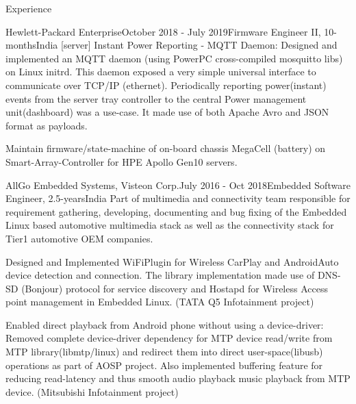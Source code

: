 \documentclass[
	a4paper, %
	11pt, %
]{resume} %
\begin{document}
\begin{rSection}{Experience}
\begin{rSubsection}{Hewlett-Packard Enterprise}{October 2018 - July 2019}{Firmware Engineer II, 10-months}{India}
            [server] Instant Power Reporting - MQTT Daemon: Designed and implemented an MQTT daemon (using PowerPC cross-compiled mosquitto libs) on Linux initrd. This daemon exposed a very simple universal interface to communicate over TCP/IP (ethernet). Periodically reporting power(instant) events from the server tray controller to the central Power management unit(dashboard) was a use-case. It made use of both Apache Avro and JSON format as payloads.
            
            Maintain firmware/state-machine of on-board chassis MegaCell (battery) on Smart-Array-Controller for HPE
Apollo Gen10 servers.


	\end{rSubsection}

	\begin{rSubsection}{AllGo Embedded Systems, Visteon Corp.}{July 2016 - Oct 2018}{Embedded Software Engineer, 2.5-years}{India}
            Part of multimedia and connectivity team responsible for requirement gathering, developing, documenting and bug fixing of the Embedded Linux based automotive multimedia stack as well as the connectivity stack for Tier1 automotive OEM companies.

            Designed and Implemented WiFiPlugin for Wireless CarPlay and AndroidAuto device detection and connection. The library implementation made use of DNS-SD (Bonjour) protocol for service discovery and Hostapd for Wireless Access point management in Embedded Linux. (TATA Q5 Infotainment project) \hfill
            
            Enabled direct playback from Android phone without using a device-driver: Removed complete device-driver dependency for MTP device read/write from MTP library(libmtp/linux) and redirect them into direct user-space(libusb) operations as part of AOSP project. Also implemented buffering feature for reducing read-latency and thus smooth audio playback music playback from MTP device. (Mitsubishi Infotainment project) \hfill


\end{rSubsection}
\end{rSection}
\end{document}
